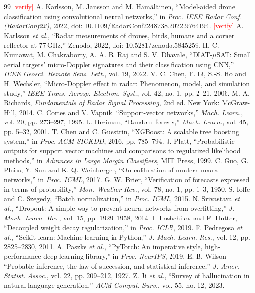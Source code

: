 \documentclass[conference]{IEEEtran}
\newcommand{\pending}[1]{\textcolor{red}{[#1]}}
\begin{document}
\begin{thebibliography}{99}
\footnotesize
\setlength{\itemsep}{0pt}\setlength{\parskip}{0pt}
 \pending{verify} A. Karlsson, M. Jansson and M. H\"am\"al\"ainen, ``Model-aided drone classification using convolutional neural networks,'' in \emph{Proc. IEEE Radar Conf. (RadarConf22)}, 2022, doi: 10.1109/RadarConf2248738.2022.9764194.
 \pending{verify} A. Karlsson \emph{et al.}, ``Radar measurements of drones, birds, humans and a corner reflector at 77\,GHz,'' Zenodo, 2022, doi: 10.5281/zenodo.5845259.
 H. C. Kumawat, M. Chakraborty, A. A. B. Raj and S. V. Dhavale, ``DIAT-$\mu$SAT: Small aerial targets' micro-Doppler signatures and their classification using CNN,'' \emph{IEEE Geosci. Remote Sens. Lett.}, vol. 19, 2022.
 V. C. Chen, F. Li, S.-S. Ho and H. Wechsler, ``Micro-Doppler effect in radar: Phenomenon, model, and simulation study,'' \emph{IEEE Trans. Aerosp. Electron. Syst.}, vol. 42, no. 1, pp. 2--21, 2006.
 M. A. Richards, \emph{Fundamentals of Radar Signal Processing}, 2nd ed. New York: McGraw-Hill, 2014.
 C. Cortes and V. Vapnik, ``Support-vector networks,'' \emph{Mach. Learn.}, vol. 20, pp. 273--297, 1995.
 L. Breiman, ``Random forests,'' \emph{Mach. Learn.}, vol. 45, pp. 5--32, 2001.
 T. Chen and C. Guestrin, ``XGBoost: A scalable tree boosting system,'' in \emph{Proc. ACM SIGKDD}, 2016, pp. 785--794.
 J. Platt, ``Probabilistic outputs for support vector machines and comparisons to regularized likelihood methods,'' in \emph{Advances in Large Margin Classifiers}, MIT Press, 1999.
 C. Guo, G. Pleiss, Y. Sun and K. Q. Weinberger, ``On calibration of modern neural networks,'' in \emph{Proc. ICML}, 2017.
 G. W. Brier, ``Verification of forecasts expressed in terms of probability,'' \emph{Mon. Weather Rev.}, vol. 78, no. 1, pp. 1--3, 1950.
 S. Ioffe and C. Szegedy, ``Batch normalization,'' in \emph{Proc. ICML}, 2015.
 N. Srivastava \emph{et al.}, ``Dropout: A simple way to prevent neural networks from overfitting,'' \emph{J. Mach. Learn. Res.}, vol. 15, pp. 1929--1958, 2014.
 I. Loshchilov and F. Hutter, ``Decoupled weight decay regularization,'' in \emph{Proc. ICLR}, 2019.
 F. Pedregosa \emph{et al.}, ``Scikit-learn: Machine learning in Python,'' \emph{J. Mach. Learn. Res.}, vol. 12, pp. 2825--2830, 2011.
 A. Paszke \emph{et al.}, ``PyTorch: An imperative style, high-performance deep learning library,'' in \emph{Proc. NeurIPS}, 2019.
 E. B. Wilson, ``Probable inference, the law of succession, and statistical inference,'' \emph{J. Amer. Statist. Assoc.}, vol. 22, pp. 209--212, 1927.
 Z. Ji \emph{et al.}, ``Survey of hallucination in natural language generation,'' \emph{ACM Comput. Surv.}, vol. 55, no. 12, 2023.
\end{thebibliography}
\end{document}
